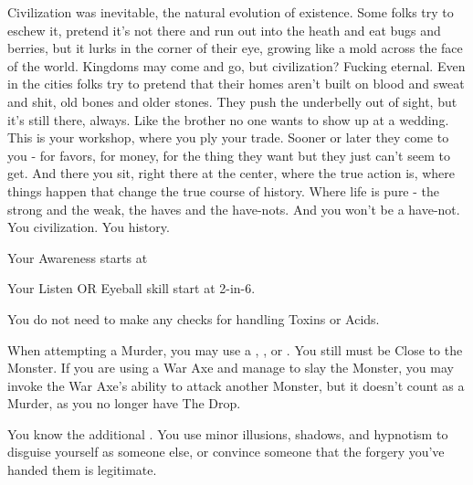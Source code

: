{  Civilization was inevitable, the natural evolution of existence.  Some folks try to eschew it, pretend it's not there and run out into the heath and eat bugs and berries, but it lurks in the corner of their eye, growing like a mold across the face of the world.  Kingdoms may come and go, but civilization?  Fucking eternal.  Even in the cities folks try to pretend that their homes aren't built on blood and sweat and shit, old bones and older stones.  They push the underbelly out of sight, but it's still there, always.  Like the brother no one wants to show up at a wedding.  This is your workshop, where you ply your trade.  Sooner or later they come to you - for favors, for money, for the thing they want but they just can't seem to get.  And there you sit, right there at the center, where the true action is, where things happen that change the true course of history.  Where life is pure - the strong and the weak, the haves and the have-nots. And you won't be a have-not.  You   civilization.  You   history.



  Your Awareness starts at \DCUP

  Your Listen OR Eyeball skill start at 2-in-6. 


  You do not need to make any checks for handling Toxins or Acids.

  When attempting a Murder, you may use a , , or . You still must be Close to the Monster.  If you are using a War Axe and manage to slay the Monster, you may invoke the War Axe's  ability to attack another Monster, but it doesn't count as a Murder, as you no longer have The Drop.

  You know the additional .  You use minor illusions, shadows, and hypnotism to disguise yourself as someone else, or convince someone that the forgery you've handed them is legitimate.

}
